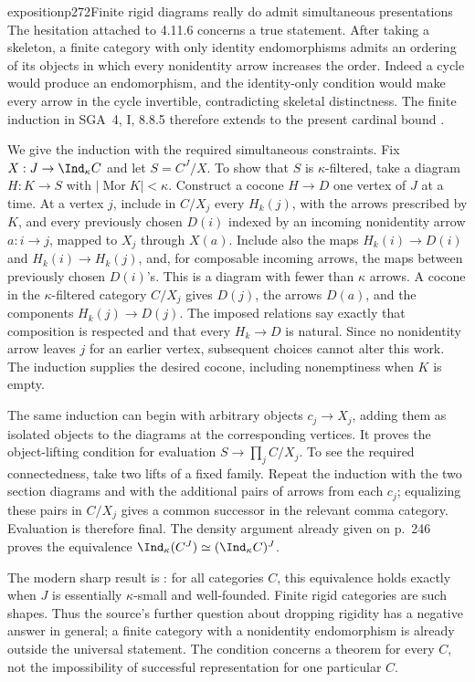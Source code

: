 \begin{dcomment}{exposition}{p272}{Finite rigid diagrams really do admit simultaneous presentations}
The hesitation attached to 4.11.6 concerns a true statement. After taking a skeleton, a finite category with only identity endomorphisms admits an ordering of its objects in which every nonidentity arrow increases the order. Indeed a cycle would produce an endomorphism, and the identity-only condition would make every arrow in the cycle invertible, contradicting skeletal distinctness. The finite induction in SGA~4, I, 8.8.5 therefore extends to the present cardinal bound \citep{SGA4I1972}.

We give the induction with the required simultaneous constraints. Fix $X:J\to\Ind_\kappa C$ and let $S=C^J/X$. To show that $S$ is $\kappa$-filtered, take a diagram $H:K\to S$ with $|\operatorname{Mor}K|<\kappa$. Construct a cocone $H\to D$ one vertex of $J$ at a time. At a vertex $j$, include in $C/X_j$ every $H_k(j)$, with the arrows prescribed by $K$, and every previously chosen $D(i)$ indexed by an incoming nonidentity arrow $a:i\to j$, mapped to $X_j$ through $X(a)$. Include also the maps $H_k(i)\to D(i)$ and $H_k(i)\to H_k(j)$, and, for composable incoming arrows, the maps between previously chosen $D(i)$'s. This is a diagram with fewer than $\kappa$ arrows. A cocone in the $\kappa$-filtered category $C/X_j$ gives $D(j)$, the arrows $D(a)$, and the components $H_k(j)\to D(j)$. The imposed relations say exactly that composition is respected and that every $H_k\to D$ is natural. Since no nonidentity arrow leaves $j$ for an earlier vertex, subsequent choices cannot alter this work. The induction supplies the desired cocone, including nonemptiness when $K$ is empty.

The same induction can begin with arbitrary objects $c_j\to X_j$, adding them as isolated objects to the diagrams at the corresponding vertices. It proves the object-lifting condition for evaluation $S\to\prod_j C/X_j$. To see the required connectedness, take two lifts of a fixed family. Repeat the induction with the two section diagrams and with the additional pairs of arrows from each $c_j$; equalizing these pairs in $C/X_j$ gives a common successor in the relevant comma category. Evaluation is therefore final. The density argument already given on p.~246 proves the equivalence $\Ind_\kappa(C^J)\simeq(\Ind_\kappa C)^J$.

The modern sharp result is \citet[Theorem~1.3]{Henry2025Ind}: for all categories $C$, this equivalence holds exactly when $J$ is essentially $\kappa$-small and well-founded. Finite rigid categories are such shapes. Thus the source's further question about dropping rigidity has a negative answer in general; a finite category with a nonidentity endomorphism is already outside the universal statement. The condition concerns a theorem for every $C$, not the impossibility of successful representation for one particular $C$.
\end{dcomment}

